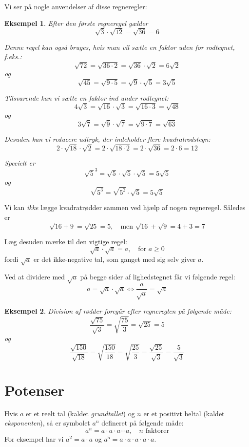 \documentclass[12pt,oneside,a4paper]{article}
\theoremstyle{plain}
\newtheorem*{eks}{Eksempel}
\begin{document}
Vi ser på nogle anvendelser af disse regneregler:
\begin{eks}
    Efter den første regneregel gælder
    $$
    \sqrt{3} \cdot \sqrt{12} = \sqrt{36} = 6
    $$
    
    Denne regel kan også bruges, hvis man vil sætte en faktor uden for rodtegnet, f.eks.:
    $$
    \sqrt{72} = \sqrt{36\cdot 2} = \sqrt{36} \cdot \sqrt{2} = 6\sqrt{2}
    $$
    og
    $$
    \sqrt{45} = \sqrt{9\cdot 5} = \sqrt{9} \cdot \sqrt{5} = 3\sqrt{5}
    $$

    Tilsvarende kan vi sætte en faktor ind under rodtegnet:
    $$
    4\sqrt{3} = \sqrt{16} \cdot \sqrt{3} = \sqrt{16\cdot 3} = \sqrt{48}
    $$
    og
    $$
    3\sqrt{7} = \sqrt{9} \cdot \sqrt{7} = \sqrt{9\cdot 7} = \sqrt{63}
    $$

    Desuden kan vi reducere udtryk, der indeholder flere kvadratrodstegn:
    $$
    2\cdot\sqrt{18} \cdot \sqrt{2} = 2\cdot\sqrt{18\cdot 2} = 2\cdot \sqrt{36}
    = 2\cdot 6 = 12
    $$

    Specielt er
    $$
    {\sqrt{5}}^3 = \sqrt{5} \cdot \sqrt{5} \cdot \sqrt{5} = 5\sqrt{5}
    $$
    og
    $$
    \sqrt{5^3} = \sqrt{5^2} \cdot \sqrt{5} = 5\sqrt{5}
    $$

\end{eks}

Vi kan {\em ikke} lægge kvadratrødder sammen ved hjælp af nogen regneregel.
Således er
$$
\sqrt{16+9} = \sqrt{25} = 5,\quad \mbox{men $\sqrt{16}+\sqrt{9} = 4+3 = 7$}
$$

Læg desuden mærke til den vigtige regel:
$$
\sqrt{a} \cdot \sqrt{a} = a,\quad \mbox{for $a\ge 0$}
$$
fordi $\sqrt{a}$ er det ikke-negative tal, som ganget med sig selv giver $a$.

Ved at dividere med $\sqrt{a}$ på begge sider af lighedstegnet får vi følgende
regel:
$$
a = \sqrt{a}\cdot\sqrt{a} \Leftrightarrow \frac{a}{\sqrt{a}} = \sqrt{a}
$$

\begin{eks}
    Division af rødder foregår efter regnereglen på følgende måde:
    $$
    \frac{\sqrt{75}}{\sqrt{3}} = \sqrt{\frac{75}{3}} = \sqrt{25} = 5
    $$
    og
    $$
    \frac{\sqrt{150}}{\sqrt{18}} = \sqrt{\frac{150}{18}} = \sqrt{\frac{25}{3}}
    = \frac{\sqrt{25}}{\sqrt{3}} = \frac{5}{\sqrt{3}}
    $$
\end{eks}


\section*{Potenser}
Hvis $a$ er et reelt tal (kaldet {\em grundtallet}) og $n$ er et positivt
heltal (kaldet {\em eksponenten}), så er symbolet $a^n$ defineret på følgende
måde:
$$
a^n = a \cdot a \cdot a \cdots a,\quad \mbox{$n$ faktorer}
$$
For eksempel har vi $a^2 = a \cdot a$ og $a^5 = a \cdot a \cdot a \cdot a \cdot a$.
\end{document}
